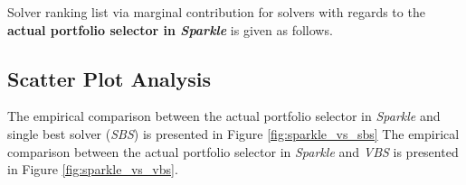 \documentclass[british]{article}
\begin{document}
\begin{enumerate} 

\end{enumerate}

Solver ranking list via marginal contribution \cite{XuEtAl12} for solvers with regards to the \textbf{actual portfolio selector in \emph{Sparkle}} is given as follows.

\begin{enumerate} 

\end{enumerate}


\subsection{Scatter Plot Analysis}

The empirical comparison between the actual portfolio selector in \emph{Sparkle} and single best solver (\emph{SBS}) is presented in Figure \ref{fig:sparkle_vs_sbs}
The empirical comparison between the actual portfolio selector in \emph{Sparkle} and \emph{VBS} is presented in Figure \ref{fig:sparkle_vs_vbs}.


%
\end{document}
